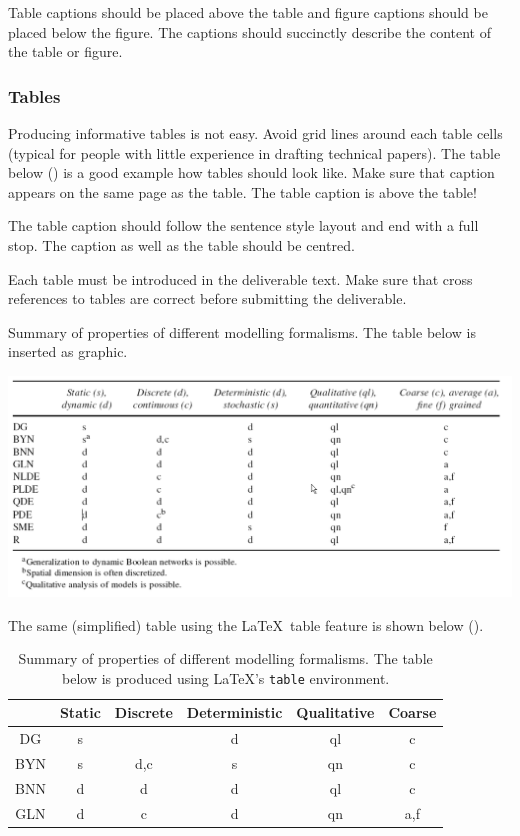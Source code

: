 Table captions should be placed above the table and figure captions should be placed below the figure. The captions should succinctly describe the content of the table or figure.

\subsubsection{Tables}
\label{sec:tables}

Producing informative tables is not easy. Avoid grid lines around each table cells (typical for people with little experience in drafting technical papers). The table below () is a good example how tables should look like. Make sure that caption appears on the same page as the table. The table caption is above the table!

The table caption should follow the sentence style layout and end with a full stop. The caption as well as the table should be centred.

Each table must be introduced in the deliverable text. Make sure that cross references to tables are correct before submitting the deliverable.

\begin{table}[htb]
	\centering
	\caption{Summary of properties of different modelling formalisms. The table below is inserted as graphic.}
	\label{tab:graphicastable}
	\includegraphics[width=1.00\linewidth]{graphics/graphicastable}  
\end{table}

The same (simplified) table using the \LaTeX\ table feature is shown below ().

\begin{table}[htb]
	\centering
	\caption{Summary of properties of different modelling formalisms. The table below is produced using \LaTeX's {\tt table} environment.}
	\label{tab:latextable}
	\begin{tabular}{cccccc}
		\hline
		& Static & Discrete & Deterministic & Qualitative & Coarse \\
	    \hline
	    DG & s &  & d & ql & c \\
	    BYN & s & d,c & s & qn & c\\
	    BNN & d & d & d & ql & c\\
	    GLN & d & c & d & qn & a,f\\
		\hline
	\end{tabular}
\end{table}

